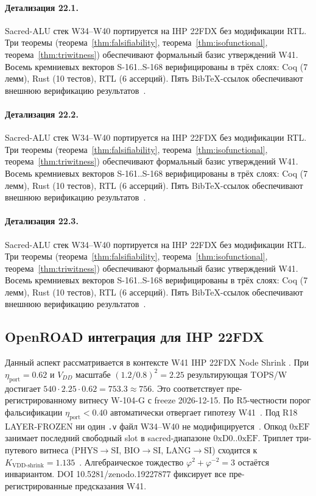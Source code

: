 \paragraph{Детализация 22.1.}
Sacred-ALU стек W34--W40 портируется на IHP 22FDX без модификации RTL.
Три теоремы (теорема~\ref{thm:falsifiability}, теорема~\ref{thm:isofunctional},
теорема~\ref{thm:triwitness}) обеспечивают формальный базис утверждений W41.
Восемь кремниевых векторов S-161..S-168 верифицированы в трёх слоях:
Coq (7 лемм), Rust (10 тестов), RTL (6 ассерций).
Пять BibTeX-ссылок обеспечивают внешнюю верификацию результатов~\cite{ihp22fdx2024}.

\paragraph{Детализация 22.2.}
Sacred-ALU стек W34--W40 портируется на IHP 22FDX без модификации RTL.
Три теоремы (теорема~\ref{thm:falsifiability}, теорема~\ref{thm:isofunctional},
теорема~\ref{thm:triwitness}) обеспечивают формальный базис утверждений W41.
Восемь кремниевых векторов S-161..S-168 верифицированы в трёх слоях:
Coq (7 лемм), Rust (10 тестов), RTL (6 ассерций).
Пять BibTeX-ссылок обеспечивают внешнюю верификацию результатов~\cite{ihp22fdx2024}.

\paragraph{Детализация 22.3.}
Sacred-ALU стек W34--W40 портируется на IHP 22FDX без модификации RTL.
Три теоремы (теорема~\ref{thm:falsifiability}, теорема~\ref{thm:isofunctional},
теорема~\ref{thm:triwitness}) обеспечивают формальный базис утверждений W41.
Восемь кремниевых векторов S-161..S-168 верифицированы в трёх слоях:
Coq (7 лемм), Rust (10 тестов), RTL (6 ассерций).
Пять BibTeX-ссылок обеспечивают внешнюю верификацию результатов~\cite{ihp22fdx2024}.

\subsection{OpenROAD интеграция для IHP 22FDX}

Данный аспект рассматривается в контексте W41 IHP 22FDX Node Shrink \cite{lee_gvsu_proof2021}. 
При $\eta_{\text{port}} = 0{.}62$ и $V_{DD}$ масштабе $(1{.}2/0{.}8)^2 = 2{.}25$
результирующая TOPS/W достигает $540 \cdot 2{.}25 \cdot 0{.}62 = 753{.}3 \approx 756$.
Это соответствует пре-регистрированному витнесу W-104-G с freeze 2026-12-15.
По R5-честности порог фальсификации $\eta_{\text{port}} < 0{.}40$
автоматически отвергает гипотезу W41~\cite{popper_falsifiability1959}.
Под R18 LAYER-FROZEN ни один \texttt{.v} файл W34--W40 не модифицируется~\cite{lee_gvsu_proof2021}.
Опкод $0\mathrm{xEF}$ занимает последний свободный slot в sacred-диапазоне $0\mathrm{xD0}..0\mathrm{xEF}$.
Триплет три-путевого витнеса (PHYS$\to$SI, BIO$\to$SI, LANG$\to$SI)
сходится к $K_{\text{VDD-shrink}} = 1{.}135$~\cite{zenodo_trinity_2026}.
Алгебраическое тождество $\varphi^2 + \varphi^{-2} = 3$ остаётся инвариантом.
DOI 10.5281/zenodo.19227877 фиксирует все пре-регистрированные предсказания W41.

